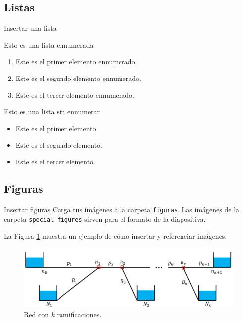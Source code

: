 \documentclass[aspectratio=169]{beamer} %
\begin{document}
\subsection{Listas}

\begin{frame}{Insertar una lista}

Esto es una lista ennumerada
\begin{enumerate}
    \item Este es el primer elemento ennumerado.
    \item Este es el segundo elemento ennumerado.
    \item Este es el tercer elemento ennumerado.
\end{enumerate}

Esto es una lista sin ennumerar
\begin{itemize}
    \item Este es el primer elemento.
    \item Este es el segundo elemento.
    \item Este es el tercer elemento.
\end{itemize}
    
\end{frame}

\subsection{Figuras}

\begin{frame}{Insertar figuras}
    Carga tus imágenes a la carpeta \texttt{figuras}. Las imágenes de la carpeta \texttt{special figures} sirven para el formato de la diapositiva.    

    La Figura \ref{fig:red_ramificada} muestra un ejemplo de cómo insertar y referenciar imágenes.

    \begin{figure}[htbp]
        \centering
        \includegraphics[width = \textwidth]{figuras/BranchedScheme.pdf} %
        \caption{Red con $k$ ramificaciones.} %
        \label{fig:red_ramificada} %
    \end{figure}
\end{frame}
\end{document}
